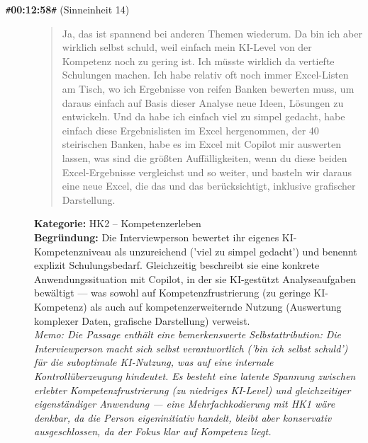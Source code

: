 \begin{description}
  \item[\texttt{\#}\textbf{00:12:58}\texttt{\#} (Sinneinheit 14)]
  \begin{quote}
  Ja, das ist spannend bei anderen Themen wiederum. Da bin ich aber wirklich selbst schuld, weil einfach mein KI-Level von der Kompetenz noch zu gering ist. Ich müsste wirklich da vertiefte Schulungen machen. Ich habe relativ oft noch immer Excel-Listen am Tisch, wo ich Ergebnisse von reifen Banken bewerten muss, um daraus einfach auf Basis dieser Analyse neue Ideen, Lösungen zu entwickeln. Und da habe ich einfach viel zu simpel gedacht, habe einfach diese Ergebnislisten im Excel hergenommen, der 40 steirischen Banken, habe es im Excel mit Copilot mir auswerten lassen, was sind die größten Auffälligkeiten, wenn du diese beiden Excel-Ergebnisse vergleichst und so weiter, und basteln wir daraus eine neue Excel, die das und das berücksichtigt, inklusive grafischer Darstellung.
  \end{quote}
  \textbf{Kategorie:} HK2 -- Kompetenzerleben\\
  \textbf{Begr\"undung:} Die Interviewperson bewertet ihr eigenes KI-Kompetenzniveau als unzureichend ('viel zu simpel gedacht') und benennt explizit Schulungsbedarf. Gleichzeitig beschreibt sie eine konkrete Anwendungssituation mit Copilot, in der sie KI-gestützt Analyseaufgaben bewältigt — was sowohl auf Kompetenzfrustrierung (zu geringe KI-Kompetenz) als auch auf kompetenzerweiternde Nutzung (Auswertung komplexer Daten, grafische Darstellung) verweist.
  \\\textit{Memo: Die Passage enthält eine bemerkenswerte Selbstattribution: Die Interviewperson macht sich selbst verantwortlich ('bin ich selbst schuld') für die suboptimale KI-Nutzung, was auf eine internale Kontrollüberzeugung hindeutet. Es besteht eine latente Spannung zwischen erlebter Kompetenzfrustrierung (zu niedriges KI-Level) und gleichzeitiger eigenständiger Anwendung — eine Mehrfachkodierung mit HK1 wäre denkbar, da die Person eigeninitiativ handelt, bleibt aber konservativ ausgeschlossen, da der Fokus klar auf Kompetenz liegt.}
\end{description}
\medskip

